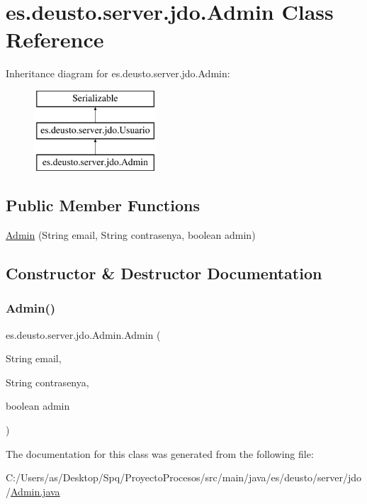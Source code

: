 \hypertarget{classes_1_1deusto_1_1server_1_1jdo_1_1_admin}{}\section{es.\+deusto.\+server.\+jdo.\+Admin Class Reference}
\label{classes_1_1deusto_1_1server_1_1jdo_1_1_admin}
Inheritance diagram for es.\+deusto.\+server.\+jdo.\+Admin\+:\begin{figure}[H]
\begin{center}
\leavevmode
\includegraphics[height=3.000000cm]{classes_1_1deusto_1_1server_1_1jdo_1_1_admin}
\end{center}
\end{figure}
\subsection*{Public Member Functions}
\begin{DoxyCompactItemize}
\item 
\mbox{\hyperlink{classes_1_1deusto_1_1server_1_1jdo_1_1_admin_abe99472772753762e542ae17d4cdf4ad}{Admin}} (String email, String contrasenya, boolean admin)
\end{DoxyCompactItemize}


\subsection{Constructor \& Destructor Documentation}
\mbox{\label{classes_1_1deusto_1_1server_1_1jdo_1_1_admin_abe99472772753762e542ae17d4cdf4ad}} 
\subsubsection{\texorpdfstring{Admin()}{Admin()}}
{\footnotesize\ttfamily es.\+deusto.\+server.\+jdo.\+Admin.\+Admin (\begin{DoxyParamCaption}\item[{String}]{email,  }\item[{String}]{contrasenya,  }\item[{boolean}]{admin }\end{DoxyParamCaption})}



The documentation for this class was generated from the following file\+:\begin{DoxyCompactItemize}
\item 
C\+:/\+Users/as/\+Desktop/\+Spq/\+Proyecto\+Procesos/src/main/java/es/deusto/server/jdo/\mbox{\hyperlink{_admin_8java}{Admin.\+java}}\end{DoxyCompactItemize}
